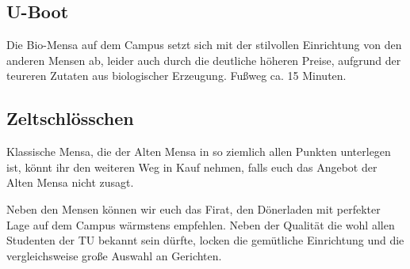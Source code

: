 \subsection*{U-Boot}
Die Bio-Mensa auf dem Campus setzt sich mit der stilvollen Einrichtung von den anderen Mensen ab, leider auch durch die deutliche höheren Preise, aufgrund der teureren Zutaten aus biologischer Erzeugung.
Fußweg ca. 15 Minuten.

\subsection*{Zeltschlösschen}
Klassische Mensa, die der Alten Mensa in so ziemlich allen Punkten unterlegen ist, könnt ihr den weiteren Weg in Kauf nehmen, falls euch das Angebot der Alten Mensa nicht zusagt.

Neben den Mensen können wir euch das Firat, den Dönerladen mit perfekter Lage auf dem Campus wärmstens empfehlen.
Neben der Qualität die wohl allen Studenten der TU bekannt sein dürfte, locken die gemütliche Einrichtung und die vergleichsweise große Auswahl an Gerichten.

